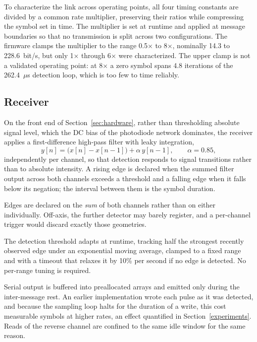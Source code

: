 To characterize the link across operating points, all four timing constants are
divided by a common rate multiplier, preserving their ratios while compressing
the symbol set in time. The multiplier is set at runtime and applied at message
boundaries so that no transmission is split across two configurations. The
firmware clamps the multiplier to the range 0.5$\times$ to 8$\times$, nominally
14.3 to 228.6~bit/s, but only 1$\times$ through 6$\times$ were characterized.
The upper clamp is not a validated operating point: at 8$\times$ a zero symbol
spans 4.8 iterations of the 262.4~$\mu$s detection loop, which is too few to
time reliably.

\subsection{Receiver}

On the front end of Section~\ref{sec:hardware}, rather than thresholding
absolute signal level, which the DC bias of the photodiode network dominates,
the receiver applies a first-difference high-pass filter with leaky
integration,
\begin{equation}
y[n] = \bigl(x[n] - x[n-1]\bigr) + \alpha\, y[n-1], \qquad \alpha = 0.85,
\end{equation}
independently per channel, so that detection responds to signal transitions
rather than to absolute intensity. A rising edge is declared when the summed
filter output across both channels exceeds a threshold and a falling edge when
it falls below its negation; the interval between them is the symbol duration.

Edges are declared on the \emph{sum} of both channels rather than on either
individually. Off-axis, the further detector may barely register, and a
per-channel trigger would discard exactly those geometries.

The detection threshold adapts at runtime, tracking half the strongest recently
observed edge under an exponential moving average, clamped to a fixed range and
with a timeout that relaxes it by 10\% per second if no edge is detected. No
per-range tuning is required.

Serial output is buffered into preallocated arrays and emitted only during the
inter-message rest. An earlier implementation wrote each pulse as it was
detected, and because the sampling loop halts for the duration of a write, this
cost measurable symbols at higher rates, an effect quantified in
Section~\ref{experiments}. Reads of the reverse channel are confined to the
same idle window for the same reason.

